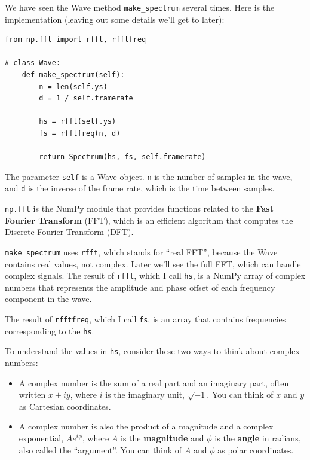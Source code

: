 \documentclass[12pt]{book}
\begin{document}
We have seen the Wave method \verb"make_spectrum" several times.
Here is the implementation (leaving out some details we'll get
to later):

\begin{verbatim}
from np.fft import rfft, rfftfreq

# class Wave:
    def make_spectrum(self):
        n = len(self.ys)
        d = 1 / self.framerate

        hs = rfft(self.ys)
        fs = rfftfreq(n, d)

        return Spectrum(hs, fs, self.framerate)
\end{verbatim}

The parameter {\tt self} is a Wave object.  {\tt n} is the number
of samples in the wave, and {\tt d} is the inverse of the
frame rate, which is the time between samples.

{\tt np.fft} is the NumPy module that provides functions related
to the {\bf Fast Fourier Transform} (FFT), which is an efficient
algorithm that computes the Discrete Fourier Transform (DFT).

\verb"make_spectrum" uses {\tt rfft}, which stands for ``real
FFT'', because the Wave contains real values, not complex.  Later
we'll see the full FFT, which can handle complex signals.  The result
of {\tt rfft}, which I call {\tt hs}, is a NumPy array of complex
numbers that represents the amplitude and phase offset of each
frequency component in the wave.

The result of {\tt rfftfreq}, which I call {\tt fs}, is an array that
contains frequencies corresponding to the {\tt hs}. 

To understand the values in {\tt hs}, consider these two ways to think
about complex numbers:

\begin{itemize}

\item A complex number is the sum of a real part and an imaginary
  part, often written $x + iy$, where $i$ is the imaginary unit,
  $\sqrt{-1}$.  You can think of $x$ and $y$ as Cartesian coordinates.

\item A complex number is also the product of a magnitude and a
  complex exponential, $A e^{i \phi}$, where $A$ is the {\bf
    magnitude} and $\phi$ is the {\bf angle} in radians, also called
  the ``argument''.  You can think of $A$ and $\phi$ as polar
  coordinates.

\end{itemize}
\end{document}
